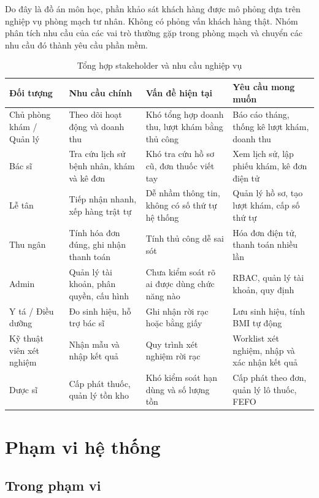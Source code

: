 Do đây là đồ án môn học, phần khảo sát khách hàng được mô phỏng dựa trên nghiệp vụ phòng mạch tư nhân. Không có phỏng vấn khách hàng thật. Nhóm phân tích nhu cầu của các vai trò thường gặp trong phòng mạch và chuyển các nhu cầu đó thành yêu cầu phần mềm.

\begin{longtable}{|p{3.2cm}|p{4.3cm}|p{4.2cm}|p{4.2cm}|}
\caption{Tổng hợp stakeholder và nhu cầu nghiệp vụ}\\
\hline
\textbf{Đối tượng} & \textbf{Nhu cầu chính} & \textbf{Vấn đề hiện tại} & \textbf{Yêu cầu mong muốn} \\
\hline
Chủ phòng khám / Quản lý & Theo dõi hoạt động và doanh thu & Khó tổng hợp doanh thu, lượt khám bằng thủ công & Báo cáo tháng, thống kê lượt khám, doanh thu \\
\hline
Bác sĩ & Tra cứu lịch sử bệnh nhân, khám và kê đơn & Khó tra cứu hồ sơ cũ, đơn thuốc viết tay & Xem lịch sử, lập phiếu khám, kê đơn điện tử \\
\hline
Lễ tân & Tiếp nhận nhanh, xếp hàng trật tự & Dễ nhầm thông tin, không có số thứ tự hệ thống & Quản lý hồ sơ, tạo lượt khám, cấp số thứ tự \\
\hline
Thu ngân & Tính hóa đơn đúng, ghi nhận thanh toán & Tính thủ công dễ sai sót & Hóa đơn điện tử, thanh toán nhiều lần \\
\hline
Admin & Quản lý tài khoản, phân quyền, cấu hình & Chưa kiểm soát rõ ai được dùng chức năng nào & RBAC, quản lý tài khoản, quy định \\
\hline
Y tá / Điều dưỡng & Đo sinh hiệu, hỗ trợ bác sĩ & Ghi nhận rời rạc hoặc bằng giấy & Lưu sinh hiệu, tính BMI tự động \\
\hline
Kỹ thuật viên xét nghiệm & Nhận mẫu và nhập kết quả & Quy trình xét nghiệm rời rạc & Worklist xét nghiệm, nhập và xác nhận kết quả \\
\hline
Dược sĩ & Cấp phát thuốc, quản lý tồn kho & Khó kiểm soát hạn dùng và số lượng tồn & Cấp phát theo đơn, quản lý lô thuốc, FEFO \\
\hline
\end{longtable}

\section{Phạm vi hệ thống}

\subsection{Trong phạm vi}

